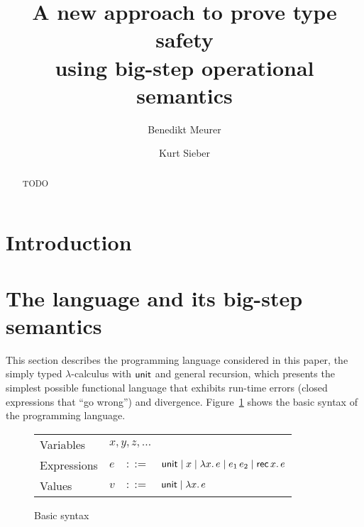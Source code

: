 \documentclass[12pt,a2paper,draft]{article}
\newcommand{\abstr}[2]{\ensuremath{\lambda{#1}.\,{#2}}}
\newcommand{\app}[2]{\ensuremath{{#1}\,{#2}}}
\newcommand{\rec}[2]{\ensuremath{{\normalfont\textsf{rec}}\,{#1}.\,{#2}}}
\newcommand{\unit}{\ensuremath{\normalfont\textsf{unit}}}
\begin{document}
\title{%
  A new approach to prove type safety\\using big-step operational semantics
}
\author{Benedikt Meurer}
\author{Kurt Sieber}
\date{}
\maketitle
\begin{abstract}
  TODO
\end{abstract}


\section{Introduction}


\section{The language and its big-step semantics}

This section describes the programming language considered in this paper,
the simply typed $\lambda$-calculus with $\unit$ and general recursion, which
presents the simplest possible functional language that exhibits run-time
errors (closed expressions that ``go wrong'') and divergence. Figure~\ref{figure:Basic_syntax}
shows the basic syntax of the programming language.

\begin{figure}[htb]
  \centering
  \begin{tabular}{llcl}
    Variables   & \multicolumn{3}{l}{$x,y,z,\ldots$} \\
    Expressions & $e$ & $::=$ & $\unit \mid x \mid \abstr{x}{e} \mid \app{e_1}{e_2} \mid \rec{x}{e}$ \\
    Values      & $v$ & $::=$ & $\unit \mid \abstr{x}{e}$
  \end{tabular}
  \caption{Basic syntax}
  \label{figure:Basic_syntax}
\end{figure}
\end{document}
